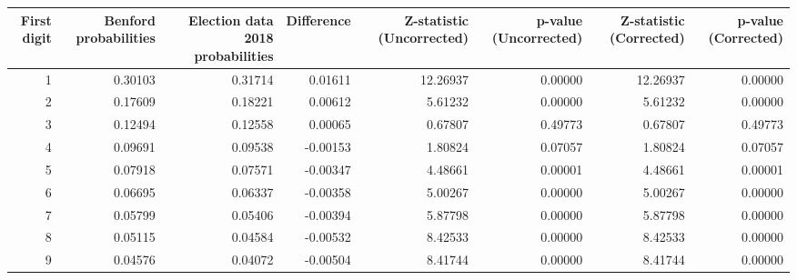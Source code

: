 \begin{tabular}{rrrrrrrr}
\toprule
 First digit &  Benford probabilities &  Election data 2018 probabilities &  Difference &  Z-statistic (Uncorrected) &  p-value (Uncorrected) &  Z-statistic (Corrected) &  p-value (Corrected) \\
\midrule
           1 &                0.30103 &                           0.31714 &     0.01611 &                   12.26937 &                0.00000 &                 12.26937 &              0.00000 \\
           2 &                0.17609 &                           0.18221 &     0.00612 &                    5.61232 &                0.00000 &                  5.61232 &              0.00000 \\
           3 &                0.12494 &                           0.12558 &     0.00065 &                    0.67807 &                0.49773 &                  0.67807 &              0.49773 \\
           4 &                0.09691 &                           0.09538 &    -0.00153 &                    1.80824 &                0.07057 &                  1.80824 &              0.07057 \\
           5 &                0.07918 &                           0.07571 &    -0.00347 &                    4.48661 &                0.00001 &                  4.48661 &              0.00001 \\
           6 &                0.06695 &                           0.06337 &    -0.00358 &                    5.00267 &                0.00000 &                  5.00267 &              0.00000 \\
           7 &                0.05799 &                           0.05406 &    -0.00394 &                    5.87798 &                0.00000 &                  5.87798 &              0.00000 \\
           8 &                0.05115 &                           0.04584 &    -0.00532 &                    8.42533 &                0.00000 &                  8.42533 &              0.00000 \\
           9 &                0.04576 &                           0.04072 &    -0.00504 &                    8.41744 &                0.00000 &                  8.41744 &              0.00000 \\
\bottomrule
\end{tabular}
